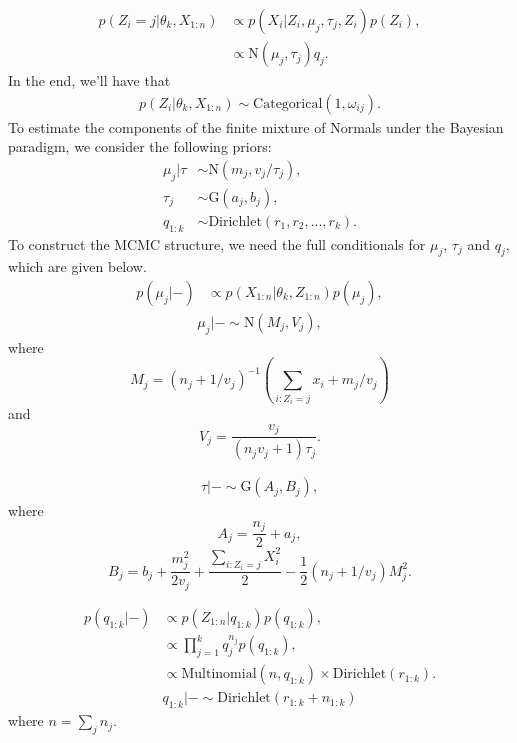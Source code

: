 \documentclass{article}
\begin{document}
\begin{align}
    p(Z_{i} = j| \theta_{k}, X_{1:n}) & \propto p(X_{i}| Z_{i}, \mu_{j}, \tau_{j}, Z_{i}) p(Z_{i}),\\
    & \propto \mbox{N}(\mu_{j}, \tau_{j})  q_{j}.
\end{align}
In the end, we'll have that
\begin{align}
p(Z_{i}| \theta_{k}, X_{1:n}) \sim \mbox{Categorical}(1, \omega_{ij}).
\end{align}
To estimate the components of the finite mixture of Normals under the Bayesian paradigm, we consider the following priors:
\begin{align}
    \mu_{j}| \tau & \sim \mbox{N}(m_{j},v_{j}/\tau_{j}),\\
    \tau_{j} & \sim \mbox{G}(a_{j}, b_{j}),\\
    q_{1:k} & \sim \mbox{Dirichlet}(r_{1}, r_{2}, ..., r_{k}).
\end{align}
To construct the MCMC structure, we need the full conditionals for $\mu_{j}$, $\tau_{j}$ and $q_{j}$, which are given below.
\begin{align}
    p(\mu_{j}| - ) & \propto p(X_{1:n}| \theta_{k}, Z_{1:n}) p(\mu_{j}), \nonumber
\end{align}
\begin{align}
    \mu_{j}| - \sim \mbox{N}(M_{j}, V_{j}),
\end{align}
where $$M_{j} = (n_{j} + 1/v_{j})^{-1} \left(\sum_{i:Z_{i}=j}x_{i}   + m_{j}/v_{j}\right)$$
and 
$$V_{j} = \frac{v_{j}}{(n_{j}v_{j} + 1) \tau_{j}}.$$

\begin{align}
    \tau| - \sim \mbox{G}(A_{j}, B_{j}),
\end{align}
where
$$ A_{j} = \frac{n_{j}}{2} + a_{j},$$
$$ B_{j} = b_{j} + \frac{m_{j}^{2}}{2v_{j}} + \frac{\sum_{i:Z_{i}=j} X_{i}^{2}}{2} - \frac{1}{2} \left( n_{j} + 1/v_{j}\right) M^{2}_{j}.$$

\begin{align}
    p(q_{1:k}| -) & \propto p(Z_{1:n}|q_{1:k}) p(q_{1:k}), \nonumber \\
    & \propto \prod_{j=1}^{k} q_{j}^{n_{j}} p(q_{1:k}), \nonumber \\
    & \propto \mbox{Multinomial}(n, q_{1:k}) \times \mbox{Dirichlet}(r_{1:k}). \nonumber
\end{align} 
\begin{align}
    q_{1:k}| - \sim \mbox{Dirichlet}(r_{1:k} + n_{1:k})
\end{align}
where $n = \sum_{j} n_{j}$.
\end{document}
